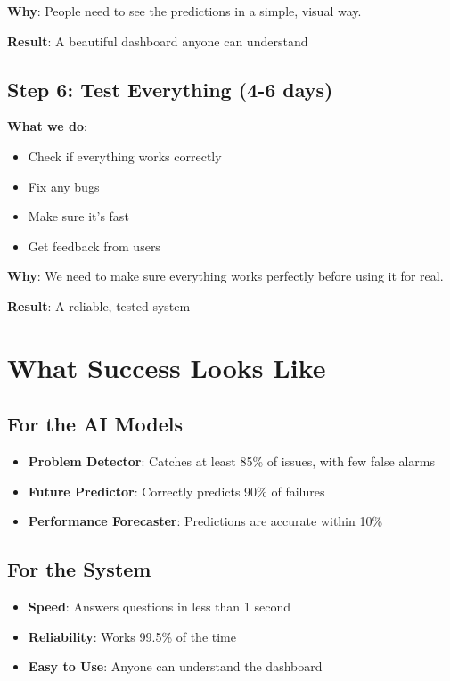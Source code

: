 \documentclass[12pt,a4paper]{article}
\begin{document}
\textbf{Why}: People need to see the predictions in a simple, visual way.

\textbf{Result}: A beautiful dashboard anyone can understand

\subsection{Step 6: Test Everything (4-6 days)}

\textbf{What we do}:
\begin{itemize}[leftmargin=*]
    \item Check if everything works correctly
    \item Fix any bugs
    \item Make sure it's fast
    \item Get feedback from users
\end{itemize}

\textbf{Why}: We need to make sure everything works perfectly before using it for real.

\textbf{Result}: A reliable, tested system

\newpage

\section{What Success Looks Like}

\subsection{For the AI Models}

\begin{itemize}[leftmargin=*]
    \item \textbf{Problem Detector}: Catches at least 85\% of issues, with few false alarms
    \item \textbf{Future Predictor}: Correctly predicts 90\% of failures
    \item \textbf{Performance Forecaster}: Predictions are accurate within 10\%
\end{itemize}

\subsection{For the System}

\begin{itemize}[leftmargin=*]
    \item \textbf{Speed}: Answers questions in less than 1 second
    \item \textbf{Reliability}: Works 99.5\% of the time
    \item \textbf{Easy to Use}: Anyone can understand the dashboard
\end{itemize}
\end{document}
